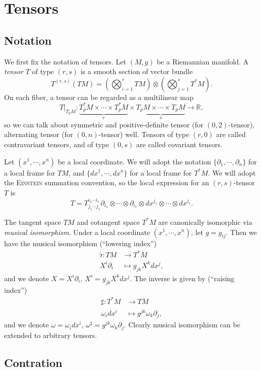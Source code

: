 \section{Tensors}

\subsection{Notation}

We first fix the notation of tensors.
Let $(M,g)$ be a Riemannian manifold.
A \emph{tensor} $T$ of type $(r,s)$ is a smooth section of vector bundle
\[T^{(r,s)}(TM)=\left(\bigotimes_{i=1}^rTM\right)\otimes\left(\bigotimes_{j=1}^sT^*M\right).\]
On each fiber, a tensor can be regarded as a multilinear map
\[T|_{T_pM}:\underbrace{T^*_pM\times\cdots\times T^*_pM}_{r}\times\underbrace{T_pM\times\cdots\times T_pM}_{s}\to\mathbb{R},\]
so we can talk about symmetric and positive-definite tensor (for $(0,2)$-tensor), alternating tensor (for $(0,n)$-tensor) well.
Tensors of type $(r,0)$ are called contravariant tensors, and of type $(0,s)$ are called covariant tensors.

Let $(x^1,\cdots,x^n)$ be a local coordinate.
We will adopt the notation $\{\partial_1,\cdots,\partial_n\}$ for a local frame for $TM$, and $\{dx^1,\cdots,dx^n\}$ for a local frame for $T^*M$.
We will adopt the \textsc{Einstein} summation convention, so the local expression for an $(r,s)$-tensor $T$ is
\[T=T^{i_1\cdots i_r}_{j_1\cdots j_s}\partial_{i_1}\otimes\cdots\otimes\partial_{i_r}\otimes dx^{j_1}\otimes\cdots\otimes dx^{j_s}.\]

The tangent space $TM$ and cotangent space $T^*M$ are canonically isomorphic via \emph{musical isomorphism}.
Under a local coordinate $(x^1,\cdots,x^n)$, let $g=g_{ij}$.
Then we have the musical isomorphism (``lowering index'')
\begin{align*}
    \flat:TM&\to T^*M\\
    X^i\partial_i&\mapsto g_{jk}X^kdx^j,
\end{align*}
and we denote $X=X^i\partial_i$, $X^\flat=g_{jk}X^kdx^j$.
The inverse is given by (``raising index'')
\begin{align*}
    \sharp:T^*M&\to TM\\
    \omega_idx^i&\mapsto g^{jk}\omega_k\partial_j,
\end{align*}
and we denote $\omega=\omega_idx^i$, $\omega^\sharp=g^{jk}\omega_k\partial_j$.
Clearly musical isomorphism can be extended to arbitrary tensors.

\subsection{Contration}

